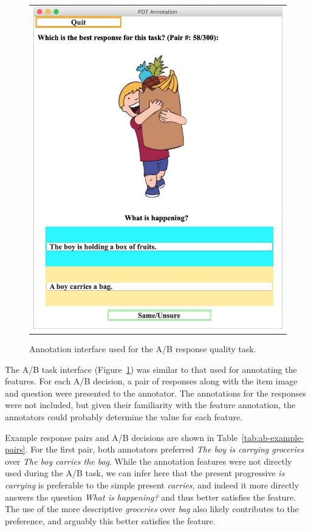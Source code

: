 \begin{figure}[htb!]
\begin{center}
\begin{tabular}{c}
\includegraphics[width=0.85\columnwidth]{figures/ab_interface.jpg} \\
\end{tabular}
\caption{\label{fig:ab-interface} Annotation interface used for the A/B response quality task.}
\end{center}
\end{figure}

The A/B task interface (Figure~\ref{fig:ab-interface}) was similar to that used for annotating the features. For each A/B decision, a pair of responses along with the item image and question were presented to the annotator. The annotations for the responses were not included, but given their familiarity with the feature annotation, the annotators could probably determine the value for each feature.  

Example response pairs and A/B decisions are shown in Table~\ref{tab:ab-example-pairs}. For the first pair, both annotators preferred \textit{The boy is carrying groceries} over \textit{The boy carries the bag}. While the annotation features were not directly used during the A/B task, we can infer here that the present progressive \textit{is carrying} is preferable to the simple present \textit{carries}, and indeed it more directly answers the question \textit{What is happening?} and thus better satisfies the  feature. The use of the more descriptive \textit{groceries} over \textit{bag} also likely contributes to the preference, and arguably this better satisfies the  feature.

